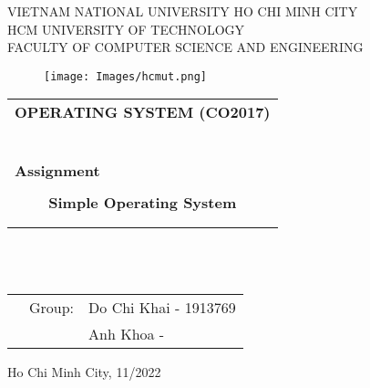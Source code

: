 \documentclass[10pt]{article}
\begin{document}
\begin{titlepage}
\begin{center}
VIETNAM NATIONAL UNIVERSITY HO CHI MINH CITY \\
HCM UNIVERSITY OF TECHNOLOGY \\
FACULTY OF COMPUTER SCIENCE AND ENGINEERING 
\end{center}

\vspace{1cm}

\begin{figure}[h!]
\begin{center}
\texttt{[image: Images/hcmut.png]}
\end{center}
\end{figure}

\vspace{1cm}


\begin{center}
\begin{tabular}{c}
\multicolumn{1}{l}{\textbf{{\Large OPERATING SYSTEM (CO2017)}}}\\
~~\\
\hline
\\
\multicolumn{1}{l}{\textbf{{\Large Assignment}}}\\
\\
\textbf{{\Huge Simple Operating System}}\\\\

\\
\hline
\end{tabular}
\end{center}
\\\\
\begin{table}[h]
\begin{tabular}{rrl}
\hspace{5cm}
			& Group: & Do Chi Khai - 1913769\\
            & & Anh Khoa - \\

\end{tabular}
\end{table}
\vspace{5cm}
\begin{center}
{\footnotesize Ho Chi Minh City, 11/2022}
\end{center}
\end{titlepage}
\end{document}
